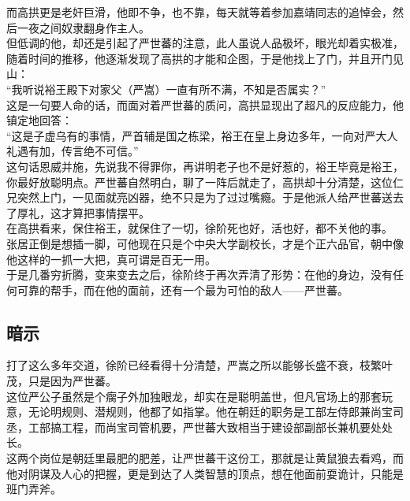 \begin{multicols}{\theparacolNo}
而高拱更是老奸巨滑，他即不争，也不靠，每天就等着参加嘉靖同志的追悼会，然后一夜之间奴隶翻身作主人。\\

但低调的他，却还是引起了严世蕃的注意，此人虽说人品极坏，眼光却着实极准，随着时间的推移，他逐渐发现了高拱的才能和企图，于是他找上了门，并且开门见山：\\

“我听说裕王殿下对家父（严嵩）一直有所不满，不知是否属实？”\\

这是一句要人命的话，而面对着严世蕃的质问，高拱显现出了超凡的反应能力，他镇定地回答：\\

“这是子虚乌有的事情，严首辅是国之栋梁，裕王在皇上身边多年，一向对严大人礼遇有加，传言绝不可信。”\\

这句话恩威并施，先说我不得罪你，再讲明老子也不是好惹的，裕王毕竟是裕王，你最好放聪明点。严世蕃自然明白，聊了一阵后就走了，高拱却十分清楚，这位仁兄突然上门，一见面就亮凶器，绝不只是为了过过嘴瘾。于是他派人给严世蕃送去了厚礼，这才算把事情摆平。\\

在高拱看来，保住裕王，就保住了一切，徐阶死也好，活也好，都不关他的事。\\

张居正倒是想插一脚，可他现在只是个中央大学副校长，才是个正六品官，朝中像他这样的一抓一大把，真可谓是百无一用。\\

于是几番穷折腾，变来变去之后，徐阶终于再次弄清了形势：在他的身边，没有任何可靠的帮手，而在他的面前，还有一个最为可怕的敌人——严世蕃。\\

\subsection{暗示}
打了这么多年交道，徐阶已经看得十分清楚，严嵩之所以能够长盛不衰，枝繁叶茂，只是因为严世蕃。\\

这位严公子虽然是个瘸子外加独眼龙，却实在是聪明盖世，但凡官场上的那套玩意，无论明规则、潜规则，他都了如指掌。他在朝廷的职务是工部左侍郎兼尚宝司丞，工部搞工程，而尚宝司管机要，严世蕃大致相当于建设部副部长兼机要处处长。\\

这两个岗位是朝廷里最肥的肥差，让严世蕃干这份工，那就是让黄鼠狼去看鸡，而他对阴谋及人心的把握，更是到达了人类智慧的顶点，想在他面前耍诡计，只能是班门弄斧。\\


\end{multicols}
